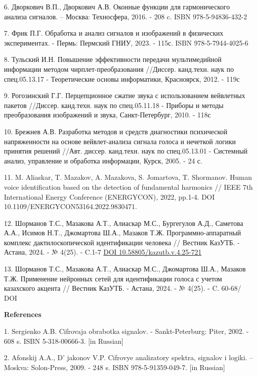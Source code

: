 6. Дворкович В.П., Дворкович А.В. Оконные функции для гармонического
анализа сигналов. -- Москва: Техносфера, 2016. - 208 c. ISBN
978-5-94836-432-2

7. Фрик П.Г. Обработка и анализ сигналов и изображений в физических
экспериментах. - Пермь: Пермский ГНИУ, 2023. - 115с. ISBN
978-5-7944-4025-6

8. Тульский И.Н. Повышение эффективности передачи мультимедийной
информации методом чирплет-преобразования //Диссер. канд.техн. наук по
спец.05.13.17 - Теоретические основы информатики, Красноярск, 2012. -
119с

9. Рогозинский Г.Г. Перцепционное сжатие звука с использованием
вейвлетных пакетов //Диссер. канд.техн. наук по спец.05.11.18 - Приборы
и методы преобразования изображений и звука, Санкт-Петербург, 2010. -
118с

10. Брежнев А.В. Разработка методов и средств диагностики психической
напряженности на основе вейвлет-анализа сигнала голоса и нечеткой логики
принятия решений //Авт. диссер. канд.техн. наук по спец.05.13.01 -
Системный анализ, управление и обработка информации, Курск, 2005. - 24
с.

11. M. Aliaskar, T. Mazakov, A. Mazakova, S. Jomartova, T. Shormanov.
Human voice identification based on the detection of fundamental
harmonics // IEEE 7th International Energy Conference
(ENERGYCON)\emph{,} 2022, pp.1-4. DOI
10.1109/ENERGYCON53164.2022.9830471.

12. Шорманов Т.С., Мазакова А.Т., Алиаскар М.С., Бургегулов А.Д.,
Саметова А.А., Исимов Н.Т., Джомартова Ш.А., Мазаков Т.Ж.
Программно-аппаратный комплекс дактилоскопической идентификации человека
// Вестник КазУТБ. - Астана, 2024. - № 4(25). - C.1-7
\href{https://doi.org/10.58805/kazutb.v.4.25-721}{DOI
10.58805/kazutb.v.4.25-721}

13. Шорманов Т.С., Мазакова А.Т., Алиаскар М.С., Джомартова Ш.А., Мазаков
Т.Ж. Применение нейронных сетей для идентификации голоса с учетом
казахского акцента // Вестник КазУТБ. - Астана, 2024. - № 4(25). - C.
60-68/ DOI
\href{https://doi.org/10.58805/kazutb.v.4.25-720}{}

{\bfseries References}

1. Sergienko A.B. Cifrovaja obrabotka signalov. - Sankt-Peterburg: Piter,
2002. - 608 s. ISBN 5-318-00666-3. {[}in Russian{]}

2. Afonskij A.A., D' jakonov V.P. Cifrovye analizatory
spektra, signalov i logiki. -- Moskva: Solon-Press, 2009. - 248 s. ISBN
978-5-91359-049-7. {[}in Russian{]}

